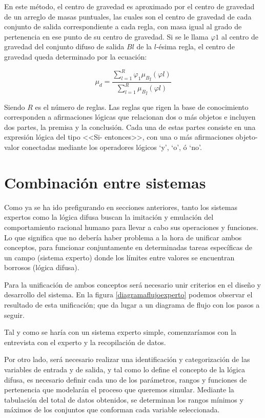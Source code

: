 \documentclass[a4paper, 11pt, titlepage]{article}
\begin{document}
        En este método, el centro de gravedad es aproximado por el centro de gravedad de un arreglo de 
        masas puntuales, las cuales son el centro de gravedad de cada conjunto de salida correspondiente 
        a cada regla, con masa igual al grado de pertenencia en ese punto de su centro de gravedad. Si 
        se le llama $\varphi 1$ al centro de gravedad del conjunto difuso de salida $Bl$ de la $l$-ésima regla, el 
        centro de gravedad queda determinado por la ecuación:

        \[
            \mu_d=\frac{\displaystyle\sum_{l=1}^{R} \varphi_1 {{\mu_B}_l(\varphi l)}}{\displaystyle\sum_{l=1}^{R}{{\mu_B}_l(\varphi l)}}
        \]

        Siendo $R$ es el número de reglas. Las reglas que rigen la base de conocimiento corresponden a 
        afirmaciones lógicas que relacionan dos o más objetos e incluyen dos partes, la premisa y la 
        conclusión. Cada una de estas partes consiste en una expresión lógica del tipo <<Si- entonces>>, 
        con una o más afirmaciones objeto-valor conectadas mediante los operadores lógicos ‘y’, ‘o’, ó 
        ‘no’. 

\section{Combinación entre sistemas}\label{combinacion}

    Como ya se ha ido prefigurando en secciones anteriores, tanto los sistemas expertos como la lógica 
    difusa buscan la imitación y emulación del comportamiento racional humano para llevar a cabo sus 
    operaciones y funciones. Lo que significa que no debería haber problema a la hora de unificar ambos 
    conceptos, para funcionar conjuntamente en determinadas tareas específicas de un campo (sistema 
    experto) donde los límites entre valores se encuentran borrosos (lógica difusa).

    Para la unificación de ambos conceptos será necesario unir criterios en el diseño y desarrollo del 
    sistema. En la figura \ref{diagramaflujoexperto} podemos observar el resultado de esta unificación; 
    que da lugar a un diagrama de flujo con los pasos a seguir. 

    Tal y como se haría con un sistema experto simple, comenzaríamos con la entrevista con el experto y 
    la recopilación de datos. 

    Por otro lado, será necesario realizar una identificación y categorización de las variables de entrada 
    y de salida, y tal como lo define el concepto 
    de la lógica difusa, es necesario definir cada uno de los parámetros, rangos y funciones de 
    pertenencia que modelarán el proceso que queremos simular. Mediante la tabulación del total de datos 
    obtenidos, se determinan los rangos mínimos y máximos de los conjuntos que conforman cada 
    variable seleccionada.
\end{document}
